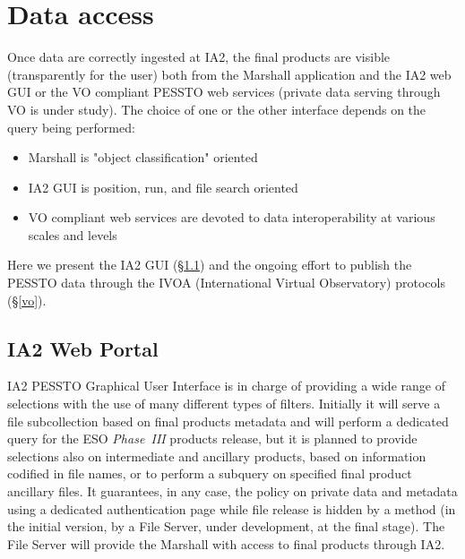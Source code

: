 \section{Data access}\label{dataaccess}

Once data are correctly ingested at IA2, the final products are visible (transparently for the user) both from the Marshall application and the IA2 web GUI or the VO compliant PESSTO web services (private data serving through VO is under study). The choice of one or the other interface depends on the query being performed:
\begin{itemize}[noitemsep,nolistsep]
	\item Marshall is "object classification" oriented
	\item {}IA2 GUI is position, run, and file search oriented
	\item{} VO compliant web services are devoted to data interoperability at various scales and levels
\end{itemize}
Here we present the IA2 GUI (\S\ref{ia2web}) and the ongoing effort to publish the PESSTO data through the IVOA (International Virtual Observatory) protocols (\S\ref{vo}).

\subsection{IA2 Web Portal}\label{ia2web}

IA2 PESSTO Graphical User Interface is in charge of providing a wide range of selections with the use of many different types of filters. Initially it will serve a file subcollection based on final products metadata and will perform a dedicated query for the ESO \textit{Phase~III} products release, but it is planned to provide selections also on intermediate and ancillary products, based on information codified in file names, or to perform a subquery on specified final product ancillary files. It guarantees, in any case, the policy on private data and metadata using a dedicated authentication page while file release is hidden by a method (in the initial version, by a File Server, under development, at the final stage). The File Server will provide the Marshall with access to final products through IA2.

